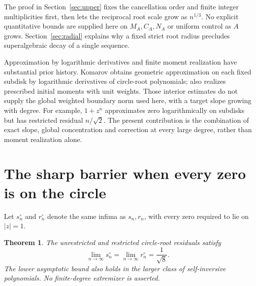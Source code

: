 \documentclass[11pt]{article}
\newtheorem{theorem}{Theorem}
\theoremstyle{remark}\newtheorem{remark}[theorem]{Remark}
\begin{document}
The proof in Section~\ref{sec:upper} fixes the cancellation order
and finite integer multiplicities first, then lets the reciprocal root
scale grow as \(n^{1/3}\). No explicit quantitative bounds are supplied here on
\(M_A,C_A,N_A\) or uniform control as \(A\) grows.
Section~\ref{sec:radial} explains why a fixed strict root radius
precludes superalgebraic decay of a single sequence.

Approximation by logarithmic derivatives and finite moment realization
have substantial prior history. Komarov \cite{komarovrate} obtains
geometric approximation on each fixed subdisk by logarithmic
derivatives of circle-root polynomials; \cite{komarovmoments}
also realizes prescribed initial moments with unit weights.
Those interior estimates do not supply the global weighted boundary
norm used here, with a target slope growing with degree. For example,
\(1+z^n\) approximates zero logarithmically on subdisks but has
restricted residual \(n/\sqrt2\). The present contribution is the
combination of exact slope, global concentration and correction at
every large degree, rather than moment realization alone.


\section{The sharp barrier when every zero is on the circle}\label{sec:circle}
Let \(s_n^\circ\) and \(r_n^\circ\) denote the same infima as
\(s_n,r_n\), with every zero required to lie on \(|z|=1\).

\begin{theorem}\label{thm:circle}
The unrestricted and restricted circle-root residuals satisfy
\[
 \lim_{n\to\infty}s_n^\circ
 =\lim_{n\to\infty}r_n^\circ=\frac1{\sqrt8}.
\]
The lower asymptotic bound also holds in the larger class of
self-inversive polynomials. No finite-degree extremizer is asserted.
\end{theorem}
\end{document}
